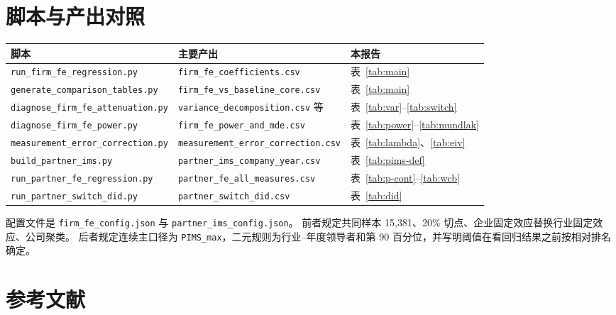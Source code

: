 \documentclass[11pt]{article}
\begin{document}
\section{脚本与产出对照}

\begin{center}
\begin{tabular}{lll}
\toprule
脚本 & 主要产出 & 本报告 \\
\midrule
\texttt{run\_firm\_fe\_regression.py} & \texttt{firm\_fe\_coefficients.csv} & 表~\ref{tab:main} \\
\texttt{generate\_comparison\_tables.py} & \texttt{firm\_fe\_vs\_baseline\_core.csv} & 表~\ref{tab:main} \\
\texttt{diagnose\_firm\_fe\_attenuation.py} & \texttt{variance\_decomposition.csv} 等 & 表~\ref{tab:var}--\ref{tab:switch} \\
\texttt{diagnose\_firm\_fe\_power.py} & \texttt{firm\_fe\_power\_and\_mde.csv} & 表~\ref{tab:power}--\ref{tab:mundlak} \\
\texttt{measurement\_error\_correction.py} & \texttt{measurement\_error\_correction.csv} & 表~\ref{tab:lambda}、\ref{tab:eiv} \\
\texttt{build\_partner\_ims.py} & \texttt{partner\_ims\_company\_year.csv} & 表~\ref{tab:pims-def} \\
\texttt{run\_partner\_fe\_regression.py} & \texttt{partner\_fe\_all\_measures.csv} & 表~\ref{tab:p-cont}--\ref{tab:wcb} \\
\texttt{run\_partner\_switch\_did.py} & \texttt{partner\_switch\_did.csv} & 表~\ref{tab:did} \\
\bottomrule
\end{tabular}
\end{center}

配置文件是 \texttt{firm\_fe\_config.json} 与 \texttt{partner\_ims\_config.json}。
前者规定共同样本 15,381、20\% 切点、企业固定效应替换行业固定效应、公司聚类。
后者规定连续主口径为 \texttt{PIMS\_max}，二元规则为行业--年度领导者和第 90 百分位，并写明阈值在看回归结果之前按相对排名确定。

\section{参考文献}
\end{document}
